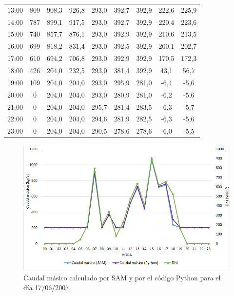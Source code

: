 \begin{table}[H]
{\begin{tabular}{ccccccccc}
13:00 & 809 & 908,3 & 926,8 & 293,0 & 392,7 & 392,9 & 222,6 & 225,9 \\
14:00 & 787 & 899,1 & 917,5 & 293,0 & 392,7 & 392,9 & 220,4 & 223,6 \\
15:00 & 740 & 857,7 & 876,1 & 293,0 & 392,9 & 392,9 & 210,6 & 213,5 \\
16:00 & 699 & 818,2 & 831,4 & 293,0 & 392,5 & 392,9 & 200,1 & 202,7 \\
17:00 & 610 & 694,2 & 706,8 & 293,0 & 392,9 & 392,9 & 170,5 & 172,3 \\
18:00 & 426 & 204,0 & 232,5 & 293,0 & 381,4 & 392,9 & 43,1  & 56,7  \\
19:00 & 109 & 204,0 & 204,0 & 293,0 & 295,9 & 281,0 & -6,4  & -5,6  \\
20:00 & 0   & 204,0 & 204,0 & 293,0 & 280,9 & 281,0 & -6,2  & -5,6  \\
21:00 & 0   & 204,0 & 204,0 & 295,7 & 281,4 & 283,5 & -6,3  & -5,7  \\
22:00 & 0   & 204,0 & 204,0 & 294,6 & 281,9 & 282,5 & -6,3  & -5,6  \\
23:00 & 0   & 204,0 & 204,0 & 290,5 & 278,6 & 278,6 & -6,0  & -5,5 
\end{tabular}%
}
\end{table}

\begin{figure}[H]
\includegraphics[width=0.9\linewidth]{images/176caudal.png}
\caption{Caudal másico calculado por SAM y por el código Python para el día 17/06/2007} 
\label{fig:176caudal}
\end{figure}

